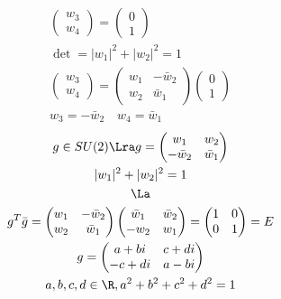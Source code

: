 \begin{gather*}
\begin{pmatrix}
        w_3 \\
        w_4
    \end{pmatrix} = \begin{pmatrix}
        0 \\
        1
    \end{pmatrix} \\
    \det = |w_1|^2+|w_2|^2 = 1 \\
    \begin{pmatrix}
        w_3 \\
        w_4
    \end{pmatrix} = \begin{pmatrix}
        w_1 &-\bar w_2 \\
        w_2 & \bar w_1
    \end{pmatrix}\begin{pmatrix}
        0 \\
        1
    \end{pmatrix} \\
    w_3 = -\bar w_2 \quad w_4 =  \bar w_1
\end{gather*}
\begin{gather*}
    g \in SU(2) \Lra g = \begin{pmatrix}
        w_1 & w_2 \\
        -\bar w_2 & \bar w_1
    \end{pmatrix} \\
    |w_1|^2 + |w_2|^2 = 1 \\
    \La\\
    g^T\bar g = \begin{pmatrix}
        w_1 & -\bar w_2 \\
        w_2 &  \bar w_1
    \end{pmatrix}\begin{pmatrix}
        \bar w_1 & \bar w_2 \\
        -w_2 & w_1
    \end{pmatrix} = \begin{pmatrix}
        1 & 0 \\
        0 & 1
    \end{pmatrix} = E\\
    g = \begin{pmatrix}
         a + bi & c + di \\
        -c + di & a - bi
    \end{pmatrix} \\
    a, b, c, d \in \R, a^2 + b^2 + c^2 + d^2 = 1
\end{gather*}

